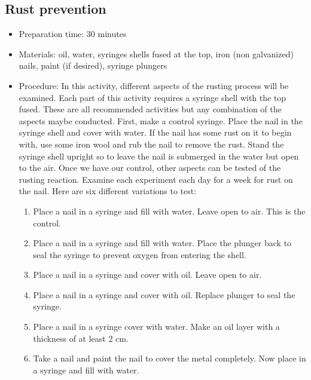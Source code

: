 \subsection{Rust prevention}
\begin{itemize}
\item{Preparation time: 30 minutes}
\item{Materials: oil, water, syringes shells fused at the top, iron (non galvanized) nails, paint (if desired), syringe plungers}
\item{Procedure: In this activity, different aspects of the rusting process will be examined. Each part of this activity requires a syringe shell with the top fused. These are all recommended activities but any combination of the aspects maybe conducted. First, make a control syringe. Place the nail in the syringe shell and cover with water. If the nail has some rust on it to begin with, use some iron wool and rub the nail to remove the rust. Stand the syringe shell upright so to leave the nail is submerged in the water but open to the air. Once we have our control, other aspects can be tested of the rusting reaction. Examine each experiment each day for a week for rust on the nail. Here are six different variations to test:

\begin{enumerate}
\item{Place a nail in a syringe and fill with water. Leave open to air. This is the control.}
\item{Place a nail in a syringe and fill with water. Place the plunger back to seal the syringe to prevent oxygen from entering the shell.}
\item{Place a nail in a syringe and cover with oil. Leave open to air.}
\item{Place a nail in a syringe and cover with oil. Replace plunger to seal the syringe.}
\item{Place a nail in a syringe cover with water. Make an oil layer with a thickness of at least 2 cm.}
\item{Take a nail and paint the nail to cover the metal completely. Now place in a syringe and fill with water.}
\end{enumerate}
} %


\end{itemize}
